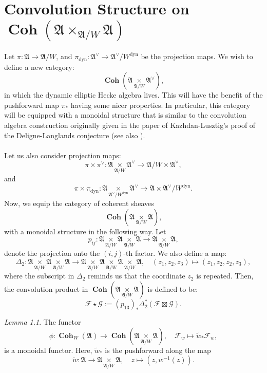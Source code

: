 \documentclass[a4paper]{report}
\theoremstyle{theorem}
\theoremstyle{definition}
\theoremstyle{remark}
\theoremstyle{proposition}
\theoremstyle{conjecture}
\theoremstyle{lemma}
\newtheorem{lemma}{Lemma}
\theoremstyle{corollary}
\theoremstyle{exercise}
\theoremstyle{example}
\newcommand{\mcal}{\mathcal}
\newcommand{\on}{\operatorname}
\newcommand{\coh}{\on{\mathbf{Coh}}}
\newcommand{\dyn}{{\on{dyn}}}
\begin{document}
  \chapter{Convolution Structure on $\coh(\mathfrak{A} \times_{\mathfrak{A}/W}\mathfrak{A})$}\label{app_C}
  
  Let $\pi : \mathfrak{A} \to \mathfrak{A}/W$, and 
  $\pi_\dyn : \mathfrak{A}^\vee \to \mathfrak{A}^\vee/W^\dyn$ be the projection
  maps. We wish to define a new category: $$\coh(\mathfrak{A}\underset{\mathfrak{A}/W}{\times} \mathfrak{A}^\vee),$$
  in which the dynamic elliptic Hecke algebra lives. This will have the benefit
  of the pushforward map $\pi_\ast$ having some nicer properties. In particular,
  this category will be equipped with a monoidal structure that is similar
  to the convolution algebra construction originally given in the paper 
  of Kazhdan-Lusztig's proof of the Deligne-Langlands conjecture \cite{kl87} 
  (see also \cite{cg09}).\\\\
  Let us also consider projection maps:
  $$\pi \times \pi^\vee : \mathfrak{A} \underset{\mathfrak{A}/W}{\times} \mathfrak{A}^\vee \longrightarrow \mathfrak{A}/W \times \mathfrak{A}^\vee,$$ and 
  $$\pi \times \pi_\dyn : \mathfrak{A} \underset{\mathfrak{A}^\vee/W^\dyn}{\times} \mathfrak{A}^\vee \longrightarrow \mathfrak{A} \times \mathfrak{A}^\vee/W^\dyn.$$
  Now, we equip the category of coherent sheaves
  $$\coh(\mathfrak{A} \underset{\mathfrak{A}/W}{\times} \mathfrak{A}),$$
  with a monoidal structure in the following way. Let
  $$p_{ij} : \mathfrak{A} \underset{\mathfrak{A}/W}{\times} \mathfrak{A} \underset{\mathfrak{A}/W}{\times} \mathfrak{A} \longrightarrow \mathfrak{A} \underset{\mathfrak{A}/W}{\times} \mathfrak{A},$$
  denote the projection onto the $(i,j)$-th factor. 
  We also define a map:
  $$\Delta_2 : \mathfrak{A} \underset{\mathfrak{A}/W}{\times} \mathfrak{A} \underset{\mathfrak{A}/W}{\times} \mathfrak{A} \longrightarrow \mathfrak{A} \underset{\mathfrak{A}/W}{\times} \mathfrak{A} \underset{\mathfrak{A}/W}{\times} \mathfrak{A} \underset{\mathfrak{A}/W}{\times}\mathfrak{A},\quad (z_1,z_2,z_3) \longmapsto (z_1,z_2,z_2,z_3),$$
  where the subscript in $\Delta_2$ reminds us that the coordinate $z_2$ 
  is repeated. Then, the convolution product in $\coh(\mathfrak{A}\underset{\mathfrak{A}/W}{\times}\mathfrak{A})$ is defined to be:
  $$\mcal{F} \star \mcal{G} := \left(p_{13}\right)_\ast \Delta_2^\ast (\mcal{F} \boxtimes \mcal{G}).$$
  \begin{lemma}\label{lem_monoidal_functor}
      The functor $$\phi : \coh_W(\mathfrak{A}) \longrightarrow \coh(\mathfrak{A} \underset{\mathfrak{A}/W}{\times}\mathfrak{A}),\quad \mcal{F}_w \longmapsto \widetilde{w}_\ast\mcal{F}_w,$$
      is a monoidal functor.
      Here, $\widetilde{w}_\ast$ is the pushforward along the map 
      $$\widetilde{w} : \mathfrak{A} \longrightarrow \mathfrak{A} \underset{\mathfrak{A}/W}{\times} \mathfrak{A},\quad z\longmapsto (z,w^{-1}(z)).$$
  \end{lemma}
  
\end{document}
